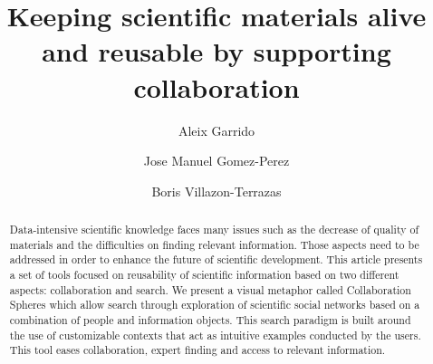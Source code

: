 \documentclass{llncs}
\begin{document}
%
\frontmatter          %
%
\pagestyle{headings}  %
%
%
\mainmatter              %
%
\title{Keeping scientific materials alive and reusable by supporting collaboration}

%
%
\author{Aleix Garrido \and Jose Manuel Gomez-Perez \and Boris Villazon-Terrazas}
%
%
%


\maketitle              %



\begin{abstract}
Data-intensive scientific knowledge faces many issues such as the decrease of quality of materials and the difficulties on finding relevant information. Those aspects need to be addressed in order to enhance the future of scientific development. This article presents a set of tools focused on reusability of scientific information based on two different aspects: collaboration and search. We present a visual metaphor called Collaboration Spheres which allow search through exploration of scientific social networks based on a combination of people and information objects. This search paradigm is built around the use of customizable contexts that act as intuitive examples conducted by the users. This tool eases collaboration, expert finding and access to relevant information.
\end{abstract}
\end{document}
